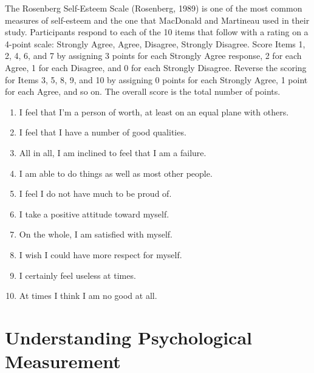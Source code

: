 \color{fgcolor}\begin{kframe}



The Rosenberg Self-Esteem Scale (Rosenberg, 1989) is one of the most common measures of self-esteem and the one that MacDonald and Martineau used in their study. Participants respond to each of the 10 items that follow with a rating on a 4-point scale: Strongly Agree, Agree, Disagree, Strongly Disagree. Score Items 1, 2, 4, 6, and 7 by assigning 3 points for each Strongly Agree response, 2 for each Agree, 1 for each Disagree, and 0 for each Strongly Disagree. Reverse the scoring for Items 3, 5, 8, 9, and 10 by assigning 0 points for each Strongly Agree, 1 point for each Agree, and so on. The overall score is the total number of points.

\begin{enumerate}
\item 
I feel that I'm a person of worth, at least on an equal plane with others. 

\item I feel that I have a number of good qualities.

\item All in all, I am inclined to feel that I am a failure.

\item I am able to do things as well as most other people.

\item I feel I do not have much to be proud of.

\item I take a positive attitude toward myself.

\item  On the whole, I am satisfied with myself.

\item I wish I could have more respect for myself. 

\item I certainly feel useless at times.
 \item At times I think I am no good at all.
\end{enumerate}
 \end{kframe}
 
 
\section{Understanding Psychological Measurement}

